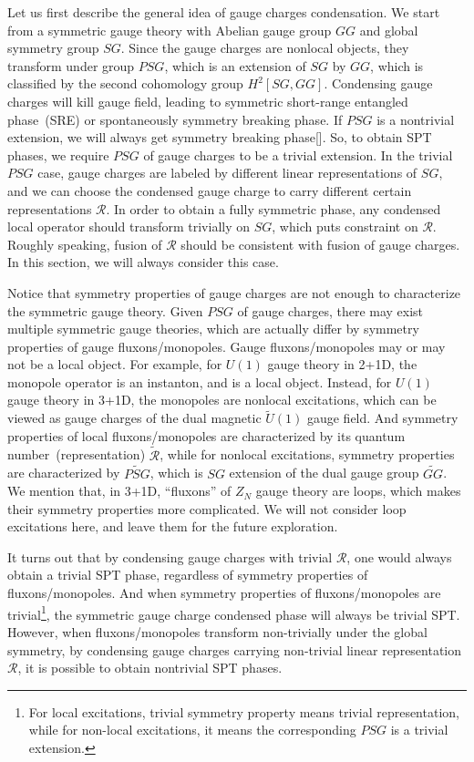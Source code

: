 \documentclass[reprint,amsmath,amssymb,aps,pra,]{revtex4-1}
\begin{document}
Let us first describe the general idea of gauge charges condensation.
We start from a symmetric gauge theory with Abelian gauge group $GG$ and global symmetry group $SG$.
Since the gauge charges are nonlocal objects, they transform under group $PSG$, which is an extension of $SG$ by $GG$\cite{Wen2002}, which is classified by the second cohomology group $H^2[SG,GG]$.
Condensing gauge charges will kill gauge field, leading to symmetric short-range entangled phase~(SRE) or spontaneously symmetry breaking phase. 
If $PSG$ is a nontrivial extension, we will always get symmetry breaking phase[].
So, to obtain SPT phases, we require $PSG$ of gauge charges to be a trivial extension.
In the trivial $PSG$ case, gauge charges are labeled by different linear representations of $SG$, and we can choose the condensed gauge charge to carry different certain representations $\mathcal{R}$.
In order to obtain a fully symmetric phase, any condensed local operator should transform trivially on $SG$, which puts constraint on $\mathcal{R}$.
Roughly speaking, fusion of $\mathcal{R}$ should be consistent with fusion of gauge charges.
In this section, we will always consider this case.

Notice that symmetry properties of gauge charges are not enough to characterize the symmetric gauge theory.
Given $PSG$ of gauge charges, there may exist multiple symmetric gauge theories, which are actually differ by symmetry properties of gauge fluxons/monopoles.
Gauge fluxons/monopoles may or may not be a local object.
For example, for $U(1)$ gauge theory in 2+1D, the monopole operator is an instanton, and is a local object.
Instead, for $U(1)$ gauge theory in 3+1D, the monopoles are nonlocal excitations, which can be viewed as gauge charges of the dual magnetic $\widetilde{U}(1)$ gauge field.
And symmetry properties of local fluxons/monopoles are characterized by its quantum number~(representation) $\widetilde{\mathcal{R}}$, while for nonlocal excitations, symmetry properties are characterized by $\widetilde{PSG}$, which is $SG$ extension of the dual gauge group $\widetilde{GG}$.
We mention that, in 3+1D, ``fluxons'' of $Z_N$ gauge theory are loops, which makes their symmetry properties more complicated.
We will not consider loop excitations here, and leave them for the future exploration.

It turns out that by condensing gauge charges with trivial $\mathcal{R}$, one would always obtain a trivial SPT phase, regardless of symmetry properties of fluxons/monopoles.
And when symmetry properties of fluxons/monopoles are trivial\footnote{For local excitations, trivial symmetry property means trivial representation, while for non-local excitations, it means the corresponding $PSG$ is a trivial extension.}, the symmetric gauge charge condensed phase will always be trivial SPT.
However, when fluxons/monopoles transform non-trivially under the global symmetry, by condensing gauge charges carrying non-trivial linear representation $\mathcal{R}$, it is possible to obtain nontrivial SPT phases.
\end{document}
